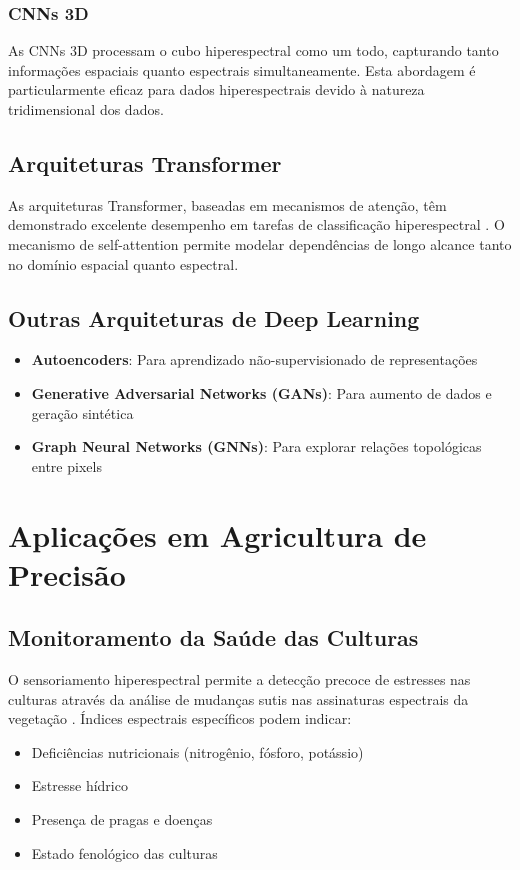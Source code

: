 \subsubsection{CNNs 3D}
As CNNs 3D processam o cubo hiperespectral como um todo, capturando tanto informações espaciais quanto espectrais simultaneamente. Esta abordagem é particularmente eficaz para dados hiperespectrais devido à natureza tridimensional dos dados.

\subsection{Arquiteturas Transformer}
As arquiteturas Transformer, baseadas em mecanismos de atenção, têm demonstrado excelente desempenho em tarefas de classificação hiperespectral \cite{Lou2024}. O mecanismo de self-attention permite modelar dependências de longo alcance tanto no domínio espacial quanto espectral.

\subsection{Outras Arquiteturas de Deep Learning}
\begin{itemize}
    \item \textbf{Autoencoders}: Para aprendizado não-supervisionado de representações
    \item \textbf{Generative Adversarial Networks (GANs)}: Para aumento de dados e geração sintética
    \item \textbf{Graph Neural Networks (GNNs)}: Para explorar relações topológicas entre pixels
\end{itemize}

\section{Aplicações em Agricultura de Precisão}\label{sec:agricultura_precisao}

\subsection{Monitoramento da Saúde das Culturas}
O sensoriamento hiperespectral permite a detecção precoce de estresses nas culturas através da análise de mudanças sutis nas assinaturas espectrais da vegetação \cite{Shin2024}. Índices espectrais específicos podem indicar:
\begin{itemize}
    \item Deficiências nutricionais (nitrogênio, fósforo, potássio)
    \item Estresse hídrico
    \item Presença de pragas e doenças
    \item Estado fenológico das culturas
\end{itemize}

